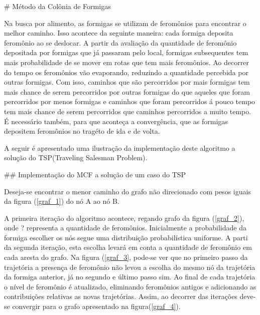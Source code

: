 # Método da Colônia de Formigas

Na busca por alimento, as formigas se utilizam de feromônios para encontrar o melhor caminho.
Isso acontece da seguinte maneira: cada formiga deposita feromônio ao se deslocar. A partir
da avaliação da quantidade de feromônio depositada por formigas que já passaram pelo local,
formigas subsequentes tem mais probabilidade de se mover em rotas que tem mais feromônios. Ao
decorrer do tempo os feromônios vão evaporando, reduzindo a quantidade percebida por outras
formigas. Com isso, caminhos que são percorridos por mais formigas tem mais chance de serem 
percorridos por outras formigas do que aqueles que foram percorridos por menos formigas e 
caminhos que foram percorridos á pouco tempo tem mais chance de serem percorridos que caminhos
percorridos a muito tempo. É necessário também, para que aconteça a convergência, que as formigas depositem
feromônios no tragéto de ida e de volta.

A seguir é apresentado uma ilustração da implementação deste algoritmo a solução do TSP(Traveling Salesman Problem).

## Implementação do MCF a solução de um caso do TSP

Deseja-se encontrar o menor caminho do grafo não direcionado com pesos iguais da figura (\ref{graf_1}) do nó A ao nó B.

A primeira iteração do algoritmo acontece, regando grafo da figura (\ref{graf_2}), onde ? representa a quantidade de feromônios.
Inicialmente a probabilidade da formiga escolher os nós segue uma distribuição probabilística uniforme. A parti da segunda iteração,
esta escolha levará em conta a quantidade de feromônio em cada aresta do grafo. Na figura (\ref{graf_3}, pode-se ver que no primeiro
passo da trajetória a presença de feromônio não levou a escolha do mesmo nó da trajetória da formiga anterior, já no segundo e último
passo sim. Ao final de cada trajetória o nível de feromônio é atualizado, eliminando feromônios antigos e adicionando as contribuições
relativas as novas trajetórias. Assim, ao decorrer das iterações deve-se convergir para o grafo apresentado na figura(\ref{graf_4}).


